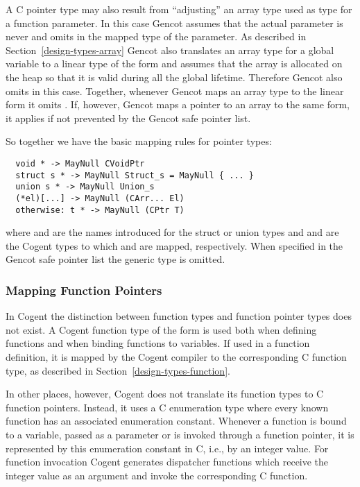 A C pointer type may also result from ``adjusting'' an array type used as type for a function parameter. In this case Gencot
assumes that the actual parameter is never  and omits  in the mapped type of the parameter.
As described in Section~\ref{design-types-array} Gencot also translates an array type for a global variable to a linear
type of the form  and assumes that the array is allocated on the heap so that it is valid during all 
the global lifetime. Therefore Gencot also omits  in this case. Together, whenever Gencot maps an array type
to the linear form  it omits . If, however, Gencot maps a pointer to an array to the 
same form, it applies  if not prevented by the Gencot safe pointer list.

So together we have the basic mapping rules for pointer types:
\begin{verbatim}
  void * -> MayNull CVoidPtr
  struct s * -> MayNull Struct_s = MayNull { ... }
  union s * -> MayNull Union_s
  (*el)[...] -> MayNull (CArr... El)
  otherwise: t * -> MayNull (CPtr T)
\end{verbatim}
where  and  are the names introduced for the struct or union types and  
and  are the Cogent types to which  and  are mapped, respectively. When specified in
the Gencot safe pointer list the generic type  is omitted.

\subsubsection{Mapping Function Pointers}

In Cogent the distinction between function types and function pointer types does not exist. 
A Cogent function type of the form  is used both when
defining functions and when binding functions to variables. If used in a function definition, it is mapped by
the Cogent compiler to the corresponding C function type, as described in Section~\ref{design-types-function}.

In other places, however, Cogent does not translate its function types to C function pointers. Instead, it uses 
a C enumeration type where every known function has an associated enumeration constant. Whenever a 
function is bound to a variable, passed as a parameter or is invoked through a function pointer, it is 
represented by this enumeration constant in C, i.e., by an integer value.
For function invocation Cogent generates dispatcher functions which receive the integer value as an argument
and invoke the corresponding C function. 


